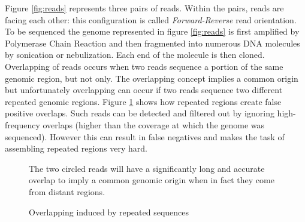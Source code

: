 \documentclass[10pt, twocolumn]{article}
\begin{document}
Figure \ref{fig:reads} represents three pairs of reads. Within the pairs, reads are facing each other: this configuration is called \textit{Forward-Reverse} read orientation. To be sequenced the genome represented in figure \ref{fig:reads} is first amplified by Polymerase Chain Reaction and then fragmented into numerous DNA molecules by sonication or nebulization. Each end of the molecule is then cloned. Overlapping of reads occurs when two reads sequence a portion of the same genomic region, but not only. The overlapping concept implies a common origin but unfortunately overlapping can occur if two reads sequence two different repeated genomic regions. Figure \ref{fig:overlapping} shows how repeated regions create false positive overlaps. Such reads can be detected and filtered out by ignoring high-frequency overlaps (higher than the coverage at which the genome was sequenced). However this can result in false negatives and makes the task of assembling repeated regions very hard.
\begin{figure}[h!]
\caption{Overlapping induced by repeated sequences}
\label{fig:overlapping}
{\footnotesize  The two circled reads will have a significantly long and accurate overlap to imply a common genomic origin when in fact they come from distant regions.}
\end{figure}
\end{document}
